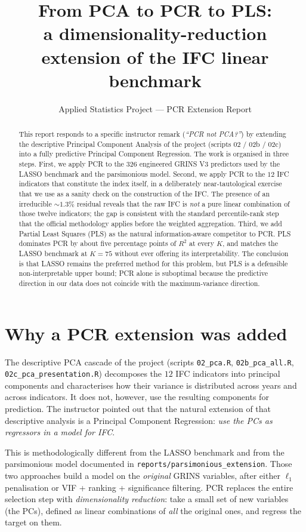 \documentclass[11pt,a4paper]{article}
\title{From PCA to PCR to PLS:\\
  a dimensionality-reduction extension of the IFC linear benchmark}
\author{Applied Statistics Project --- PCR Extension Report}
\date{}
\begin{document}
\maketitle

\begin{abstract}
\noindent
This report responds to a specific instructor remark
(\emph{``PCR not PCA?''}) by extending the descriptive
Principal Component Analysis of the project (scripts 02 / 02b /
02c) into a fully predictive Principal Component Regression. The
work is organised in three steps. First, we apply PCR to the
\(326\) engineered GRINS V3 predictors used by the LASSO benchmark
and the parsimonious model. Second, we apply PCR to the
\(12\) IFC indicators that constitute the index itself, in a
deliberately near-tautological exercise that we use as a sanity
check on the construction of the IFC. The presence of an
irreducible \(\sim 1.3\%\) residual reveals that the raw IFC is
\emph{not} a pure linear combination of those twelve indicators;
the gap is consistent with the standard percentile-rank step that
the official methodology applies before the weighted aggregation.
Third, we add Partial Least Squares (PLS) as the natural
information-aware competitor to PCR. PLS dominates PCR by about
five percentage points of \(R^{2}\) at every \(K\), and matches the
LASSO benchmark at \(K = 75\) without ever offering its
interpretability. The conclusion is that LASSO remains the
preferred method for this problem, but PLS is a defensible
non-interpretable upper bound; PCR alone is suboptimal because the
predictive direction in our data does not coincide with the
maximum-variance direction.
\end{abstract}

\section{Why a PCR extension was added}

The descriptive PCA cascade of the project (scripts
\texttt{02\_pca.R}, \texttt{02b\_pca\_all.R},
\texttt{02c\_pca\_presentation.R}) decomposes the \(12\) IFC
indicators into principal components and characterises how their
variance is distributed across years and across indicators. It
does not, however, use the resulting components for prediction.
The instructor pointed out that the natural extension of that
descriptive analysis is a Principal Component Regression:
\emph{use the PCs as regressors in a model for IFC}.

This is methodologically different from the LASSO benchmark and
from the parsimonious model documented in
\verb|reports/parsimonious_extension|. Those two approaches build a
model on the \emph{original} GRINS variables, after either
\(\ell_{1}\) penalisation or VIF + ranking + significance
filtering. PCR replaces the entire selection step with
\emph{dimensionality reduction}: take a small set of new variables
(the PCs), defined as linear combinations of \emph{all} the
original ones, and regress the target on them.
\end{document}

